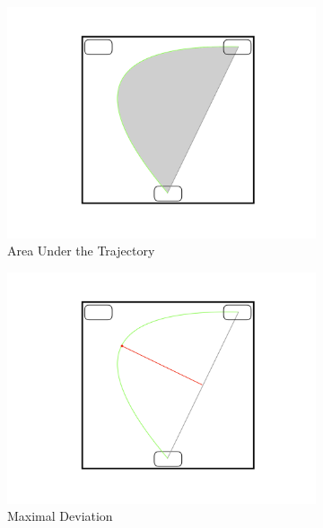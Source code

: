 \documentclass{article}
\begin{document}
\begin{figure}[h]
\centering
\begin{subfigure}[b]{0.3\textwidth}
\includegraphics[width=\textwidth]{AUC.pdf}
\caption{Area Under the Trajectory}
\end{subfigure}
%
\begin{subfigure}[b]{0.3\textwidth}
\includegraphics[width=\textwidth]{MD.pdf}
\caption{Maximal Deviation}
\end{subfigure}
%
\begin{subfigure}[b]{0.3\textwidth}

\end{subfigure}
\end{figure}
\end{document}
